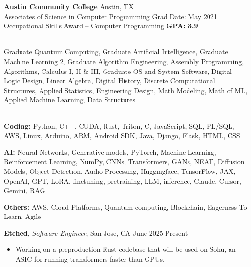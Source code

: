 \documentclass[a4paper,10pt]{article}
\begin{document}
\vspace{5pt}
\noindent\textbf{Austin Community College} \hfill Austin, TX \\
Associates of Science in Computer Programming \hfill Grad Date: May 2021 \\
Occupational Skills Award – Computer Programming \hfill \textbf{GPA: 3.9}

\vspace{5pt}
 \\
Graduate Quantum Computing, Graduate Artificial Intelligence, Graduate Machine Learning 2, Graduate Algorithm Engineering, Assembly Programming, Algorithms, Calculus I, II \& III, Graduate OS and System Software, Digital Logic Design, Linear Algebra, Digital History, Discrete Computational Structures, Applied Statistics, Engineering Design, Math Modeling, Math of ML, Applied Machine Learning, Data Structures


\vspace{5pt}
 \vspace{1pt} \\
\textbf{Coding:} Python, C++, CUDA, Rust, Triton, C, JavaScript, SQL, PL/SQL, AWS, Linux, Arduino, ARM, Android SDK, Java, Django, Flask, HTML, CSS

\noindent\textbf{AI:} Neural Networks, Generative models, PyTorch, Machine Learning, Reinforcement Learning, NumPy, CNNs, Transformers, GANs, NEAT, Diffusion Models, Object Detection, Audio Processing, Huggingface, TensorFlow, JAX, OpenAI, GPT, LoRA, finetuning, pretraining, LLM, inference, Claude, Cursor, Gemini, RAG

\noindent\textbf{Others:} AWS, Cloud Platforms, Quantum computing, Blockchain, Eagerness To Learn, Agile







\vspace{5pt}
 \vspace{1pt}

\noindent\textbf{Etched}, \textit{Software Engineer}, San Jose, CA \hfill June 2025-Present
\begin{itemize}[noitemsep,topsep=0pt]
  \item Working on a preproduction Rust codebase that will be used on Sohu, an ASIC for running transformers faster than GPUs.
\end{itemize}
\end{document}
